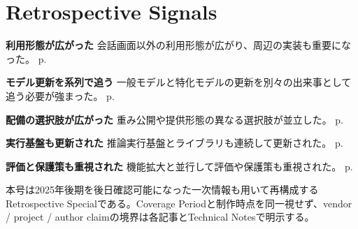 \section*{Retrospective Signals}
\smallskip
\noindent\textbf{利用形態が広がった} 会話画面以外の利用形態が広がり、周辺の実装も重要になった。 \hfill{\footnotesize p.~\pageref{pkg:agent}}\par
\smallskip
\noindent\textbf{モデル更新を系列で追う} 一般モデルと特化モデルの更新を別々の出来事として追う必要が強まった。 \hfill{\footnotesize p.~\pageref{pkg:model}}\par
\smallskip
\noindent\textbf{配備の選択肢が広がった} 重み公開や提供形態の異なる選択肢が並立した。 \hfill{\footnotesize p.~\pageref{pkg:open}}\par
\smallskip
\noindent\textbf{実行基盤も更新された} 推論実行基盤とライブラリも連続して更新された。 \hfill{\footnotesize p.~\pageref{pkg:runtime}}\par
\smallskip
\noindent\textbf{評価と保護策も重視された} 機能拡大と並行して評価や保護策も重視された。 \hfill{\footnotesize p.~\pageref{pkg:control}}\par
\medskip
\begin{claimboundary}
本号は2025年後期を後日確認可能になった一次情報も用いて再構成するRetrospective Specialである。Coverage Periodと制作時点を同一視せず、vendor / project / author claimの境界は各記事とTechnical Notesで明示する。
\end{claimboundary}
\medskip
\setcounter{tocdepth}{1}
\tableofcontents
